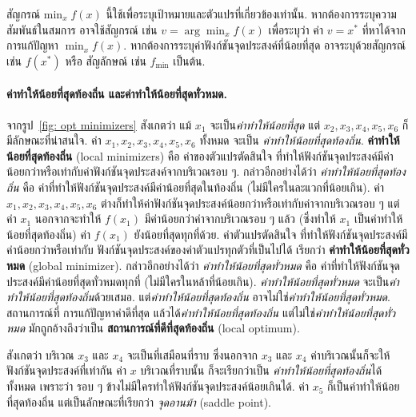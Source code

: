 สัญกรณ์ $\mathrm{min}_x \; f(x)$ นี้ใช้เพื่อระบุเป้าหมายและตัวแปรที่เกี่ยวข้องเท่านั้น.
หากต้องการระบุความสัมพันธ์ในสมการ
อาจใช้สัญกรณ์ เช่น $v = \arg\min_x f(x)$
เพื่อระบุว่า ค่า $v = x^\ast$  ที่หาได้จากการแก้ปัญหา $\min_x f(x)$.
หากต้องการระบุค่าฟังก์ชันจุดประสงค์ที่น้อยที่สุด
อาจระบุด้วยสัญกรณ์ เช่น $f(x^\ast)$ หรือ สัญลักษณ์ เช่น $f_{\min}$ เป็นต้น.

\paragraph{ค่าทำให้น้อยที่สุดท้องถิ่น และค่าทำให้น้อยที่สุดทั่วหมด.}
จากรูป~\ref{fig: opt minimizers}
สังเกตว่า แม้ $x_1$ จะเป็น\textit{ค่าทำให้น้อยที่สุด}
แต่ $x_2, x_3, x_4, x_5, x_6$ ก็มีลักษณะที่น่าสนใจ.
ค่า $x_1, x_2, x_3, x_4, x_5, x_6$ ทั้งหมด
จะเป็น \textit{ค่าทำให้น้อยที่สุดท้องถิ่น}.
%
\textbf{ค่าทำให้น้อยที่สุดท้องถิ่น} (local minimizers)
คือ
ค่าของตัวแปรตัดสินใจ 
ที่ทำให้ฟังก์ชันจุดประสงค์มีค่าน้อยกว่าหรือเท่ากับค่าฟังก์ชันจุดประสงค์จากบริเวณรอบ ๆ.
กล่าวอีกอย่างได้ว่า
\textit{ค่าทำให้น้อยที่สุดท้องถิ่น} คือ ค่าที่ทำให้ฟังก์ชันจุดประสงค์มีค่าน้อยที่สุดในท้องถิ่น (ไม่มีใครในละแวกที่น้อยเกิน).
ค่า $x_1, x_2, x_3, x_4, x_5, x_6$ ต่างก็ทำให้ค่าฟังก์ชันจุดประสงค์น้อยกว่าหรือเท่ากับค่าจากบริเวณรอบ ๆ
แต่ค่า $x_1$ นอกจากจะทำให้ $f(x_1)$ มีค่าน้อยกว่าค่าจากบริเวณรอบ ๆ แล้ว 
(ซึ่งทำให้ $x_1$ เป็นค่าทำให้น้อยที่สุดท้องถิ่น)
ค่า $f(x_1)$ ยังน้อยที่สุดทุกที่ด้วย.
ค่าตัวแปรตัดสินใจ 
ที่ทำให้ฟังก์ชันจุดประสงค์มีค่าน้อยกว่าหรือเท่ากับ
ฟังก์ชันจุดประสงค์ของค่าตัวแปรทุกตัวที่เป็นไปได้
เรียกว่า \textbf{ค่าทำให้น้อยที่สุดทั่วหมด} (global minimizer).
กล่าวอีกอย่างได้ว่า
\textit{ค่าทำให้น้อยที่สุดทั่วหมด} 
คือ
ค่าที่ทำให้ฟังก์ชันจุดประสงค์มีค่าน้อยที่สุดทั่วหมดทุกที่ (ไม่มีใครในหล้าที่น้อยเกิน).
\textit{ค่าทำให้น้อยที่สุดทั่วหมด}
จะเป็น\textit{ค่าทำให้น้อยที่สุดท้องถิ่น}ด้วยเสมอ.
แต่\textit{ค่าทำให้น้อยที่สุดท้องถิ่น}
อาจไม่ใช่\textit{ค่าทำให้น้อยที่สุดทั่วหมด}.
สถานการณ์ที่ การแก้ปัญหาค่าดีที่สุด 
แล้วได้\textit{ค่าทำให้น้อยที่สุดท้องถิ่น}
แต่ไม่ใช่\textit{ค่าทำให้น้อยที่สุดทั่วหมด}
มักถูกอ้างถึงว่าเป็น \textbf{สถานการณ์ที่ดีที่สุดท้องถิ่น} (local optimum).

สังเกตว่า บริเวณ $x_3$ และ $x_4$ จะเป็นที่เสมือนที่ราบ ซึ่งนอกจาก $x_3$ และ $x_4$ ค่าบริเวณนั้นก็จะให้ฟังก์ชันจุดประสงค์ที่เท่ากัน ค่า $x$ บริเวณที่ราบนั้น ก็จะเรียกว่าเป็น \textit{ค่าทำให้น้อยที่สุดท้องถิ่น}ได้ทั้งหมด 
เพราะว่า 
รอบ ๆ ข้างไม่มีใครทำให้ฟังก์ชันจุดประสงค์น้อยเกินได้.
ค่า $x_5$ ก็เป็นค่าทำให้น้อยที่สุดท้องถิ่น
แต่เป็นลักษณะที่เรียกว่า \textit{จุดอานม้า} (saddle point).
 
